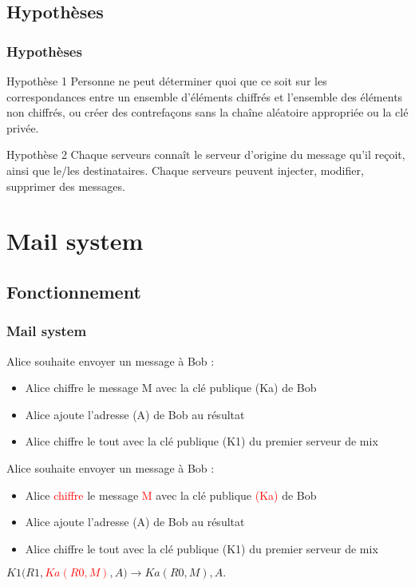 \documentclass{beamer}
\begin{document}
\subsection{Hypothèses}
\begin{frame}
\frametitle{Hypothèses}
\begin{block}{Hypothèse 1}
Personne ne peut déterminer quoi que ce soit sur les correspondances entre un ensemble d'éléments chiffrés et l'ensemble des éléments non chiffrés, ou créer des contrefaçons sans la chaîne aléatoire appropriée ou la clé privée.
\end{block}
\pause
\begin{block}{Hypothèse 2}
Chaque serveurs connaît le serveur d'origine du message qu'il reçoit, ainsi que le/les destinataires. Chaque serveurs peuvent injecter, modifier, supprimer des messages.
\end{block}

\end{frame}

\section{Mail system}
\subsection{Fonctionnement}
\begin{frame}
\frametitle{Mail system}
Alice souhaite envoyer un message à Bob :
\begin{itemize}
[triangle]
\item Alice chiffre le message M avec la clé publique (Ka) de Bob
\item Alice ajoute l'adresse (A) de Bob au résultat
\item Alice chiffre le tout avec la clé publique (K1) du premier serveur de mix
\end{itemize}
\end{frame}

\begin{frame}
Alice souhaite envoyer un message à Bob :
\begin{itemize}
[triangle]
\item Alice \textcolor{red}{chiffre} le message \textcolor{red}{M} avec la clé publique \textcolor{red}{(Ka)} de Bob
\item Alice ajoute l'adresse (A) de Bob au résultat
\item Alice chiffre le tout avec la clé publique (K1) du premier serveur de mix
\end{itemize}
\begin{center}
$K1( R1, $\textcolor{red}{$Ka( R0, M )$}$, A ) \rightarrow Ka( R0, M ), A.$
\end{center}
\end{frame}
\end{document}
